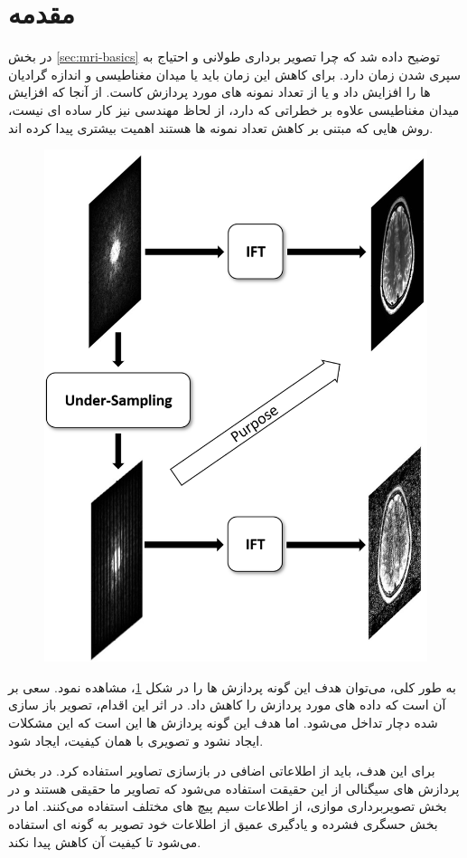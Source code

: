 \section{مقدمه}

در بخش \ref{sec:mri-basics}
 توضیح داده شد که چرا تصویر برداری \mri طولانی و احتیاج به سپری شدن زمان دارد. برای کاهش این زمان باید یا میدان مغناطیسی و اندازه گرادیان ها را افزایش داد و یا از تعداد نمونه های مورد پردازش کاست. از آنجا که افزایش میدان مغناطیسی علاوه بر خطراتی که دارد، از لحاظ مهندسی نیز کار ساده ای نیست، روش هایی که مبتنی بر کاهش تعداد نمونه ها هستند اهمیت بیشتری پیدا کرده اند.
 
 

\begin{figure}[t]
	\centering
	\includegraphics[width=0.3\linewidth]{chapters/chapter-3/figs/purpose-diagram}
	\caption{}
	\label{fig:purpose-diagram}
\end{figure}

 به طور کلی، می‌توان هدف این گونه پردازش ها را در شکل \ref{fig:purpose-diagram}، مشاهده نمود. سعی بر آن است که داده های مورد پردازش را کاهش داد. در اثر این اقدام، تصویر باز سازی شده دچار تداخل
می‌شود. اما هدف این گونه پردازش ها این است که این مشکلات ایجاد نشود و تصویری با همان کیفیت، ایجاد شود.  

برای این هدف، باید از اطلاعاتی اضافی در بازسازی تصاویر استفاده کرد. در بخش پردازش های سیگنالی از این حقیقت استفاده می‌شود که تصاویر ما حقیقی هستند و در بخش تصویربرداری موازی، از اطلاعات سیم پیچ های مختلف استفاده می‌کنند. اما در بخش حسگری فشرده و یادگیری عمیق از اطلاعات خود تصویر به گونه ای استفاده می‌شود تا کیفیت آن کاهش پیدا نکند. 
















